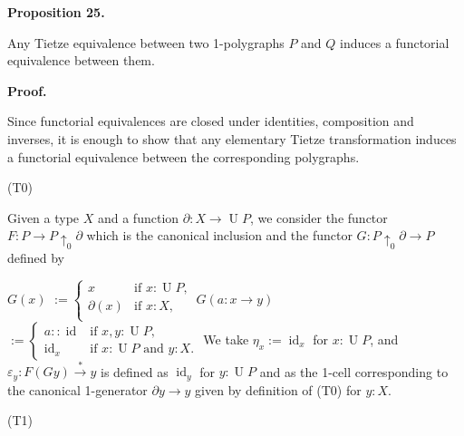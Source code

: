 \documentclass[10pt,a4paper]{amsart}
\begin{document}
 
\par\medskip\noindent\textbf{Proposition 25.}\par
 
 
Any Tietze equivalence between two 1-polygraphs $P$ and $Q$ induces a functorial equivalence between them.\par
 
 
 
 
 
\par\medskip\noindent\textbf{Proof.}\par
 
 
Since functorial equivalences are closed under identities, composition and inverses, it is enough to show that any elementary Tietze transformation induces a functorial equivalence between the corresponding polygraphs.\par
  (T0)  
 
Given a type $X$ and a function $\partial:X\to\operatorname{U}P$, we consider the functor $F:P\to P{\uparrow_{0}}\partial$ which is the canonical inclusion and the functor $G:P{\uparrow_{0}}\partial\to P$ defined by\par
    $\displaystyle G(x)$ $\displaystyle:=\begin{cases}x&\text{if $x:\operatorname{U}P$,}\\
\partial(x)&\text{if $x:X$,}\\
\end{cases}$ $\displaystyle G(a:x\to y)$ $\displaystyle:=\begin{cases}a::\operatorname{id}&\text{if $x,y:\operatorname{U}P$,}\\
\operatorname{id}_{x}&\text{if $x:\operatorname{U}P$ and $y:X$.}\end{cases}$    
We take $\eta_{x}:=\operatorname{id}_{x}$ for $x:\operatorname{U}P$, and $\varepsilon_{y}:F(Gy)\overset{*}{\to}y$ is defined as $\operatorname{id}_{y}$ for $y:\operatorname{U}P$ and as the 1-cell corresponding to the canonical 1-generator $\partial y\to y$ given by definition of (T0) for $y:X$.\par
 
  (T1)  
 
\end{document}
